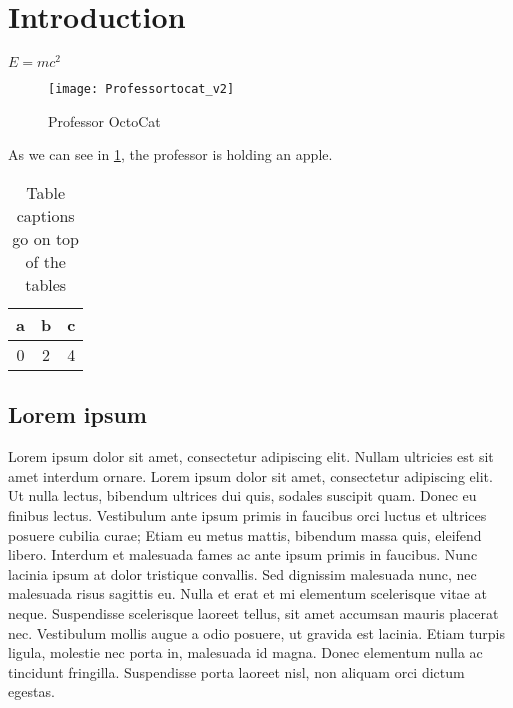
\section{Introduction}%
\label{sec:introduction}

\(E = mc^2\) \cite{einstein}

\begin{figure}[H]
    \centering
    \texttt{[image: Professortocat\_v2]}
    \caption{Professor OctoCat}%
    \label{fig:profocto}
\end{figure}

As we can see in \cref{fig:profocto}, the professor is holding an apple.

\begin{table}[H]
    \begin{center}
    \caption{Table captions go on top of the tables}%
    \label{tab:example}
    \begin{tabular}{ccc}
        \toprule
        a & b & c \\
        \midrule
        0 & 2 & 4 \\
        \bottomrule
    \end{tabular}
    \end{center}
\end{table}

\subsection{Lorem ipsum}%
\label{sub:lorem_ipsum}

Lorem ipsum dolor sit amet, consectetur adipiscing elit. Nullam ultricies est sit amet interdum ornare. Lorem ipsum dolor sit amet, consectetur adipiscing elit. Ut nulla lectus, bibendum ultrices dui quis, sodales suscipit quam. Donec eu finibus lectus. Vestibulum ante ipsum primis in faucibus orci luctus et ultrices posuere cubilia curae; Etiam eu metus mattis, bibendum massa quis, eleifend libero. Interdum et malesuada fames ac ante ipsum primis in faucibus. Nunc lacinia ipsum at dolor tristique convallis. Sed dignissim malesuada nunc, nec malesuada risus sagittis eu. Nulla et erat et mi elementum scelerisque vitae at neque. Suspendisse scelerisque laoreet tellus, sit amet accumsan mauris placerat nec. Vestibulum mollis augue a odio posuere, ut gravida est lacinia. Etiam turpis ligula, molestie nec porta in, malesuada id magna. Donec elementum nulla ac tincidunt fringilla. Suspendisse porta laoreet nisl, non aliquam orci dictum egestas.

